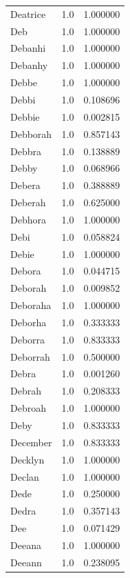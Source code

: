 \documentclass[
  letterpaper,
  DIV=11,
  numbers=noendperiod]{scrreprt}
\begin{document}
\begin{tabular}{lrr}
Deatrice        &   1.0 &   1.000000 \\
Deb             &   1.0 &   1.000000 \\
Debanhi         &   1.0 &   1.000000 \\
Debanhy         &   1.0 &   1.000000 \\
Debbe           &   1.0 &   1.000000 \\
Debbi           &   1.0 &   0.108696 \\
Debbie          &   1.0 &   0.002815 \\
Debborah        &   1.0 &   0.857143 \\
Debbra          &   1.0 &   0.138889 \\
Debby           &   1.0 &   0.068966 \\
Debera          &   1.0 &   0.388889 \\
Deberah         &   1.0 &   0.625000 \\
Debhora         &   1.0 &   1.000000 \\
Debi            &   1.0 &   0.058824 \\
Debie           &   1.0 &   1.000000 \\
Debora          &   1.0 &   0.044715 \\
Deborah         &   1.0 &   0.009852 \\
Deboraha        &   1.0 &   1.000000 \\
Deborha         &   1.0 &   0.333333 \\
Deborra         &   1.0 &   0.833333 \\
Deborrah        &   1.0 &   0.500000 \\
Debra           &   1.0 &   0.001260 \\
Debrah          &   1.0 &   0.208333 \\
Debroah         &   1.0 &   1.000000 \\
Deby            &   1.0 &   0.833333 \\
December        &   1.0 &   0.833333 \\
Decklyn         &   1.0 &   1.000000 \\
Declan          &   1.0 &   1.000000 \\
Dede            &   1.0 &   0.250000 \\
Dedra           &   1.0 &   0.357143 \\
Dee             &   1.0 &   0.071429 \\
Deeana          &   1.0 &   1.000000 \\
Deeann          &   1.0 &   0.238095 \\

\end{tabular}
\end{document}

